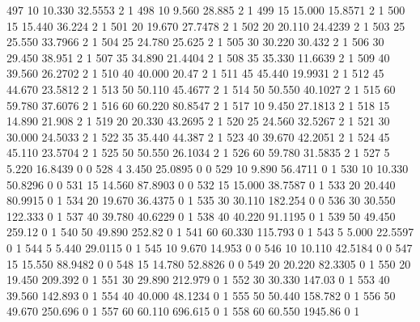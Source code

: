 {497 10 10.330 32.5553 2 1
498 10 9.560 28.885 2 1
499 15 15.000 15.8571 2 1
500 15 15.440 36.224 2 1
501 20 19.670 27.7478 2 1
502 20 20.110 24.4239 2 1
503 25 25.550 33.7966 2 1
504 25 24.780 25.625 2 1
505 30 30.220 30.432 2 1
506 30 29.450 38.951 2 1
507 35 34.890 21.4404 2 1
508 35 35.330 11.6639 2 1
509 40 39.560 26.2702 2 1
510 40 40.000 20.47 2 1
511 45 45.440 19.9931 2 1
512 45 44.670 23.5812 2 1
513 50 50.110 45.4677 2 1
514 50 50.550 40.1027 2 1
515 60 59.780 37.6076 2 1
516 60 60.220 80.8547 2 1
517 10 9.450 27.1813 2 1
518 15 14.890 21.908 2 1
519 20 20.330 43.2695 2 1
520 25 24.560 32.5267 2 1
521 30 30.000 24.5033 2 1
522 35 35.440 44.387 2 1
523 40 39.670 42.2051 2 1
524 45 45.110 23.5704 2 1
525 50 50.550 26.1034 2 1
526 60 59.780 31.5835 2 1
527 5 5.220 16.8439 0 0
528 4 3.450 25.0895 0 0
529 10 9.890 56.4711 0 1
530 10 10.330 50.8296 0 0
531 15 14.560 87.8903 0 0
532 15 15.000 38.7587 0 1
533 20 20.440 80.9915 0 1
534 20 19.670 36.4375 0 1
535 30 30.110 182.254 0 0
536 30 30.550 122.333 0 1
537 40 39.780 40.6229 0 1
538 40 40.220 91.1195 0 1
539 50 49.450 259.12 0 1
540 50 49.890 252.82 0 1
541 60 60.330 115.793 0 1
543 5 5.000 22.5597 0 1
544 5 5.440 29.0115 0 1
545 10 9.670 14.953 0 0
546 10 10.110 42.5184 0 0
547 15 15.550 88.9482 0 0
548 15 14.780 52.8826 0 0
549 20 20.220 82.3305 0 1
550 20 19.450 209.392 0 1
551 30 29.890 212.979 0 1
552 30 30.330 147.03 0 1
553 40 39.560 142.893 0 1
554 40 40.000 48.1234 0 1
555 50 50.440 158.782 0 1
556 50 49.670 250.696 0 1
557 60 60.110 696.615 0 1
558 60 60.550 1945.86 0 1
}\dadospontos
{}\dadosfontea
{}\dadosgeoma
{}\dadosfonteb
{}\dadosgeomb
{}\dadosfontec
{}\dadosgeomc
